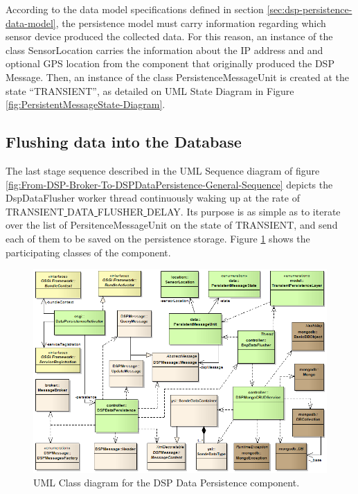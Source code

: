 According to the data model specifications defined in section
\ref{sec:dsp-persistence-data-model}, the persistence model must carry
information regarding which sensor device produced the collected data. For
this reason, an instance of the class SensorLocation carries the information
about the IP address and and optional GPS location from the component that
originally produced the DSP Message. Then, an instance of the class
PersistenceMessageUnit is created at the state ``TRANSIENT'', as detailed
on UML State Diagram in Figure \ref{fig:PersistentMessageState-Diagram}.

\subsection{Flushing data into the Database}

The last stage sequence described in the UML Sequence diagram of figure
\ref{fig:From-DSP-Broker-To-DSPDataPersistence-General-Sequence} depicts the
DspDataFlusher worker thread continuously waking up at the rate of
TRANSIENT\underline{ }DATA\underline{ }FLUSHER\underline{ }DELAY. Its purpose
is as simple as to iterate over the list of PersitenceMessageUnit on the state
of TRANSIENT, and send each of them to be saved on the persistence storage.
Figure \ref{fig:DSP-Data-Persistence-Classes} shows the participating classes
of the component.

\begin{figure}[!b]
  \centering
  \includegraphics[scale=0.5]{../diagrams/DSP-Data-Persistence-Classes}
  \caption{UML Class diagram for the DSP Data Persistence component.}
  \label{fig:DSP-Data-Persistence-Classes}
\end{figure}

